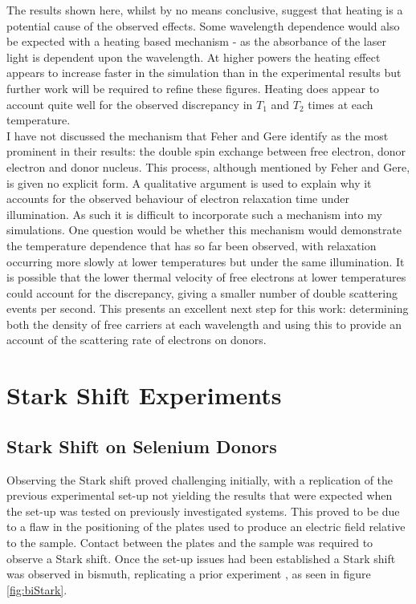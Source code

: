 The results shown here, whilst by no means conclusive, suggest that heating is a potential cause of the observed effects.
Some wavelength dependence would also be expected with a heating based mechanism - as the absorbance of the laser light is dependent upon the wavelength. 
At higher powers the heating effect appears to increase faster in the simulation than in the experimental results but further work will be required to refine these figures.
Heating does appear to account quite well for the observed discrepancy in $T_1$ and $T_2$ times at each temperature.
\\
I have not discussed the mechanism that Feher and Gere identify as the most prominent in their results: the double spin exchange between free electron, donor electron and donor nucleus.
This process, although mentioned by Feher and Gere, is given no explicit form.
A qualitative argument is used to explain why it accounts for the observed behaviour of electron relaxation time under illumination.
As such it is difficult to incorporate such a mechanism into my simulations.
One question would be whether this mechanism would demonstrate the temperature dependence that has so far been observed, with relaxation occurring more slowly at lower temperatures but under the same illumination.
It is possible that the lower thermal velocity of free electrons at lower temperatures could account for the discrepancy, giving a smaller number of double scattering events per second.
This presents an excellent next step for this work: determining both the density of free carriers at each wavelength and using this to provide an account of the scattering rate of electrons on donors.

\section{Stark Shift Experiments}

\subsection{Stark Shift on Selenium Donors}

Observing the Stark shift proved challenging initially, with a replication of the previous experimental set-up not yielding the results that were expected when the set-up was tested on previously investigated systems.
This proved to be due to a flaw in the positioning of the plates used to produce an electric field relative to the sample.
Contact between the plates and the sample was required to observe a Stark shift.
Once the set-up issues had been established a Stark shift was observed in bismuth, replicating a prior experiment \cite{Wolfowicz2014}, as seen in figure \ref{fig:biStark}.


